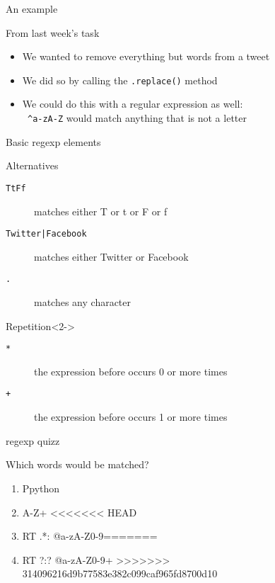 \documentclass{beamer}
\begin{document}
\begin{frame}{An example}
\begin{block}{From last week's task}
\begin{itemize}
\item We wanted to remove everything but words from a tweet
\item We did so by calling the \texttt{.replace()} method
\item We could do this with a regular expression as well: \\
{\tt{ \lbrack \^{}a-zA-Z\rbrack}} would match anything that is not a letter
\end{itemize}
\end{block}
\end{frame}

\begin{frame}{Basic regexp elements}
\begin{block}{Alternatives}
\begin{description}
\item[{\tt{\lbrack TtFf\rbrack}}] matches either T or t or F or f
\item[{\tt{Twitter|Facebook}}] matches either Twitter or Facebook
\item[{\tt{.}}] matches any character
\end{description}
\end{block}
\begin{block}{Repetition}<2->
\begin{description}
\item[{\tt{*}}] the expression before occurs 0 or more times
\item[{\tt{+}}] the expression before occurs 1 or more times
\end{description}
\end{block}
\end{frame}

\begin{frame}{regexp quizz}
\begin{block}{Which words would be matched?}
\tt
\begin{enumerate}
\item<1-> \lbrack Pp\rbrack ython
\item<2-> \lbrack A-Z\rbrack +
<<<<<<< HEAD
\item<3-> RT .*: @\lbrack a-zA-Z0-9\rbrack *
=======
\item<3-> RT ?:? @\lbrack a-zA-Z0-9\rbrack +
>>>>>>> 314096216d9b77583e382c099caf965fd8700d10
\end{enumerate}
\end{block}
\end{frame}
\end{document}
